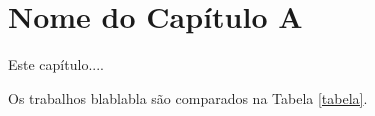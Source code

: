 \chapter{Nome do Capítulo A}

Este capítulo....

\begin{table}
\caption{Comparação dos trabalhos\label{tabela}}
\end{table}

Os trabalhos blablabla são comparados na Tabela \ref{tabela}. 
